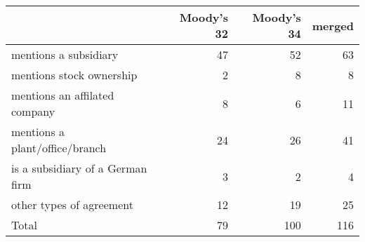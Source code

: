 \begin{tabular}{lrrr}
\toprule
 & Moody's 32 & Moody's 34 & merged \\
\midrule
mentions a subsidiary & 47 & 52 & 63 \\
mentions stock ownership & 2 & 8 & 8 \\
mentions an affilated company & 8 & 6 & 11 \\
mentions a plant/office/branch & 24 & 26 & 41 \\
is a subsidiary of a German firm & 3 & 2 & 4 \\
other types of agreement & 12 & 19 & 25 \\
Total & 79 & 100 & 116 \\
\bottomrule
\end{tabular}
